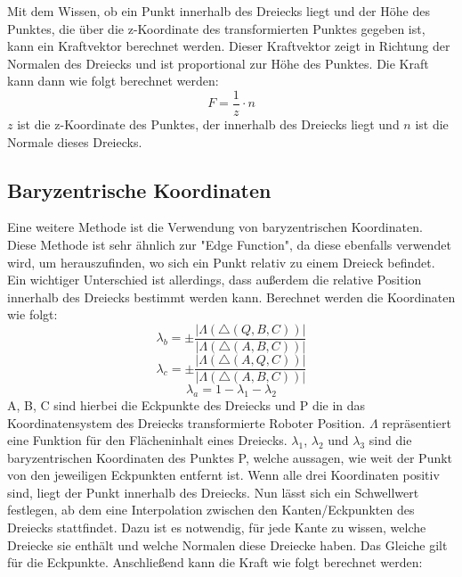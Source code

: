 \documentclass[conference]{IEEEtran}
\begin{document}
Mit dem Wissen, ob ein Punkt innerhalb des Dreiecks liegt und der Höhe des Punktes, die über 
die z-Koordinate des transformierten Punktes gegeben ist, kann ein Kraftvektor berechnet werden. 
Dieser Kraftvektor zeigt in Richtung der Normalen des Dreiecks und ist proportional zur Höhe des Punktes. 
Die Kraft kann dann wie folgt berechnet werden:
\begin{equation}
    F = \frac{1}{z} \cdot n
\end{equation}
$z$ ist die z-Koordinate des Punktes, der innerhalb des Dreiecks liegt und $n$ ist die Normale dieses Dreiecks.

\subsection{Baryzentrische Koordinaten} \label{bary}
Eine weitere Methode ist die Verwendung von baryzentrischen Koordinaten. 
Diese Methode ist sehr ähnlich zur "Edge Function", da diese ebenfalls verwendet wird, um herauszufinden, 
wo sich ein Punkt relativ zu einem Dreieck befindet. Ein wichtiger Unterschied ist allerdings, dass 
außerdem die relative Position innerhalb des Dreiecks bestimmt werden kann. Berechnet werden die 
Koordinaten wie folgt:
\begin{equation*}
    \lambda_b = \pm\frac{|\Lambda(\triangle(Q,B,C))|}{|\Lambda(\triangle(A,B,C))|}
\end{equation*}
\begin{equation}
    \lambda_c = \pm\frac{|\Lambda(\triangle(A,Q,C))|}{|\Lambda(\triangle(A,B,C))|}
\end{equation}
\begin{equation*}
    \lambda_a = 1 - \lambda_1 - \lambda_2
\end{equation*}
A, B, C sind hierbei die Eckpunkte des Dreiecks und P die in das Koordinatensystem des Dreiecks 
transformierte Roboter Position. $\Lambda$ repräsentiert eine Funktion für den Flächeninhalt eines Dreiecks. 
$\lambda_1$, $\lambda_2$ und $\lambda_3$ sind die baryzentrischen Koordinaten des Punktes P, welche aussagen, 
wie weit der Punkt von den jeweiligen Eckpunkten entfernt ist. 
Wenn alle drei Koordinaten positiv sind, liegt der Punkt innerhalb des Dreiecks. Nun lässt sich ein 
Schwellwert festlegen, ab dem eine Interpolation zwischen den Kanten/Eckpunkten des Dreiecks stattfindet. 
Dazu ist es notwendig, für jede Kante zu wissen, welche Dreiecke sie enthält und welche Normalen diese 
Dreiecke haben. Das Gleiche gilt für die Eckpunkte. Anschließend kann die Kraft wie folgt 
berechnet werden:
\end{document}
